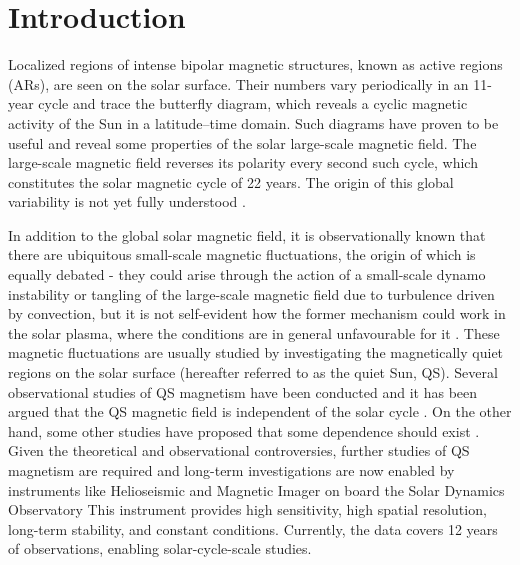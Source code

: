 \documentclass{aa}
\begin{document}

\maketitle

\section{Introduction} \label{sec:intro}

Localized regions of intense bipolar magnetic structures, known as active regions
(ARs), are seen on the solar surface. Their numbers vary periodically 
in an 11-year cycle
and trace the
butterfly 
diagram,
which 
reveals 
a cyclic magnetic activity of the Sun in a latitude--time
domain. Such diagrams have proven to be useful and reveal some properties of 
the solar large-scale magnetic field. The large-scale magnetic field reverses its polarity every
second such cycle, which constitutes the solar magnetic cycle of 22 years. The origin of this
global variability is not yet fully understood \citep[see, e.g.,][]{char10}.

In addition to the global solar magnetic field, it is observationally known that there are ubiquitous small-scale magnetic fluctuations, the origin of which is equally debated - they could arise through the action of a small-scale dynamo instability or tangling of the large-scale magnetic field due to turbulence driven by convection, but it is not self-evident how the former mechanism could work in the solar plasma, where the conditions are in general unfavourable for it \citep[see, e.g.][]{BS05}. These magnetic fluctuations are usually studied by investigating the magnetically quiet regions on the solar surface (hereafter referred to as the quiet Sun, QS). Several observational
studies of QS magnetism have been conducted and it has been argued
that the QS magnetic field is 
independent of the solar cycle 
\cite[see, e.g.,][]{Kleint+10,Buehler+13,Faurobert+15,Jin+15b,Jin+15a}. On the other hand, some other studies have proposed
that some dependence should exist \cite[e.g.,][]{Lites+14,Meunier06,Faurobert+21}. 
Given the theoretical and observational controversies, further studies of QS magnetism are required and long-term investigations are now enabled by instruments like
Helioseismic and Magnetic Imager \cite[HMI,][]{2012SoPh..275..207S,2012SoPh..275..229S} on board the Solar Dynamics Observatory \cite[SDO,][]{2012SoPh..275....3P}
This instrument
provides high sensitivity, high spatial
resolution, long-term stability, and constant conditions. Currently, the data covers 12 years of observations, enabling solar-cycle-scale studies.
\end{document}
